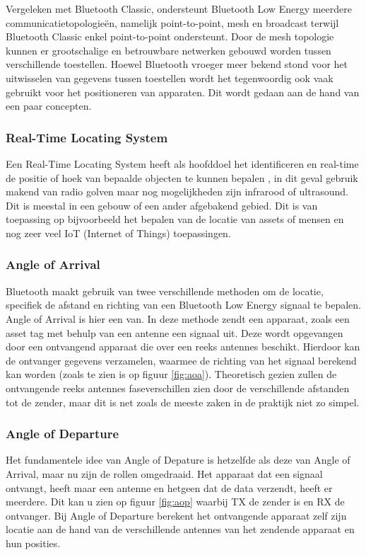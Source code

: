 Vergeleken met Bluetooth Classic, ondersteunt Bluetooth Low Energy meerdere communicatietopologieën, namelijk point-to-point, mesh en broadcast terwijl Bluetooth Classic enkel point-to-point ondersteunt. Door de mesh topologie kunnen er grootschalige en betrouwbare netwerken gebouwd worden tussen verschillende toestellen. Hoewel Bluetooth vroeger meer bekend stond voor het uitwisselen van gegevens tussen toestellen wordt het tegenwoordig ook vaak gebruikt voor het positioneren van apparaten. Dit wordt gedaan aan de hand van een paar concepten.\\

\subsubsection{Real-Time Locating System}

Een Real-Time Locating System heeft als hoofddoel het identificeren en real-time de positie of hoek van bepaalde objecten te kunnen bepalen \autocite{Lehtimaki2018}, in dit geval gebruik makend van radio golven maar nog mogelijkheden zijn infrarood of ultrasound. Dit is meestal in een gebouw of een ander afgebakend gebied. Dit is van toepassing op bijvoorbeeld het bepalen van de locatie van assets of mensen en nog zeer veel IoT (Internet of Things) toepassingen.

\subsubsection{Angle of Arrival}

Bluetooth maakt gebruik van twee verschillende methoden om de locatie, specifiek de afstand en richting van een Bluetooth Low Energy signaal te bepalen. Angle of Arrival is hier een van. 
In deze methode zendt een apparaat, zoals een asset tag met behulp van een antenne een signaal uit. Deze wordt opgevangen door een ontvangend apparaat die over een reeks antennes beschikt. Hierdoor kan de ontvanger gegevens verzamelen, waarmee de richting van het signaal berekend kan worden (zoals te zien is op figuur \ref{fig:aoa}). Theoretisch gezien zullen de ontvangende reeks antennes faseverschillen zien door de verschillende afstanden tot de zender, maar dit is net zoals de meeste zaken in de praktijk niet zo simpel.
\subsubsection{Angle of Departure}

Het fundamentele idee van Angle of Depature is hetzelfde als deze van Angle of Arrival, maar nu zijn de rollen omgedraaid. Het apparaat dat een signaal ontvangt, heeft maar een antenne en hetgeen dat de data verzendt, heeft er meerdere. Dit kan u zien op figuur \ref{fig:aop} waarbij TX de zender is en RX de ontvanger. Bij Angle of Departure berekent het ontvangende apparaat zelf zijn locatie aan de hand van de verschillende antennes van het zendende apparaat en hun posities.\\

